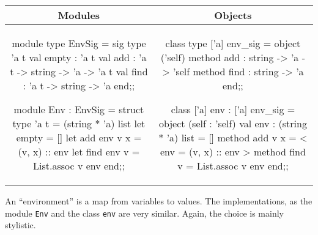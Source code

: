 \begin{center}
\begin{tabular}{c|c}
Modules & Objects\\
\hline\hline
\begin{minipage}[t]{2.2in}
\begin{ocamllistingy}
module type EnvSig = sig
   type 'a t
   val empty : 'a t
   val add : 'a t -> string -> 'a -> 'a t
   val find : 'a t -> string -> 'a
end;;

module Env : EnvSig = struct
   type 'a t = (string * 'a) list
   let empty = []
   let add env v x = (v, x) :: env
   let find env v = List.assoc v env
end;;
\end{ocamllistingy}
\end{minipage}
&
\begin{minipage}[t]{2.2in}
\begin{ocamllistingy}
class type ['a] env_sig =
  object ('self)
    method add : string -> 'a -> 'self
    method find : string -> 'a
  end;;

class ['a] env : ['a] env_sig =
  object (self : 'self)
    val env : (string * 'a) list = []
    method add v x =
      {< env = (v, x) :: env >}
    method find v = List.assoc v env
  end;;
\end{ocamllistingy}
\end{minipage}
\end{tabular}
\label{page:polyclasses-env}
\end{center}

An ``environment'' is a map from variables to values.  The
implementations, as the module \hbox{\lstinline$Env$} and the
class \hbox{\lstinline$env$} are very similar.  Again, the choice is mainly
stylistic.

